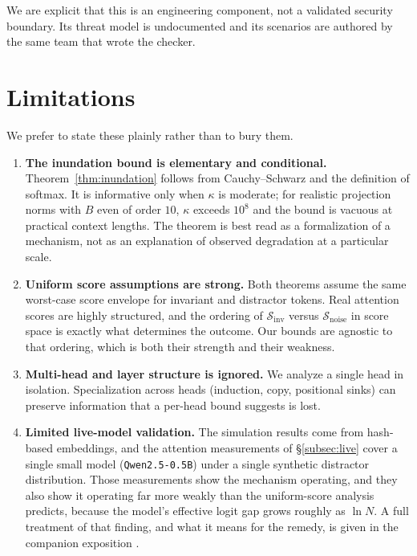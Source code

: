 ﻿\documentclass[11pt,a4paper]{article}
\theoremstyle{plain}
\theoremstyle{definition}
\theoremstyle{remark}
\begin{document}
We are explicit that this is an engineering component, not a validated security
boundary. Its threat model is undocumented and its scenarios are authored by the
same team that wrote the checker.

\section{Limitations}
\label{sec:limits}

We prefer to state these plainly rather than to bury them.

\begin{enumerate}
  \item \textbf{The inundation bound is elementary and conditional.}
        Theorem~\ref{thm:inundation} follows from Cauchy--Schwarz and the
        definition of softmax. It is informative only when $\kappa$ is moderate;
        for realistic projection norms with $B$ even of order $10$, $\kappa$
        exceeds $10^{8}$ and the bound is vacuous at practical context lengths.
        The theorem is best read as a formalization of a mechanism, not as an
        explanation of observed degradation at a particular scale.

  \item \textbf{Uniform score assumptions are strong.} Both theorems assume the
        same worst-case score envelope for invariant and distractor tokens.
        Real attention scores are highly structured, and the ordering of
        $\mathcal{S}_{\mathrm{inv}}$ versus $\mathcal{S}_{\mathrm{noise}}$ in
        score space is exactly what determines the outcome. Our bounds are
        agnostic to that ordering, which is both their strength and their
        weakness.

  \item \textbf{Multi-head and layer structure is ignored.} We analyze a single
        head in isolation. Specialization across heads (induction, copy,
        positional sinks) can preserve information that a per-head bound
        suggests is lost.

  \item \textbf{Limited live-model validation.} The simulation results come from
        hash-based embeddings, and the attention measurements of
        \S\ref{subsec:live} cover a single small model
        (\texttt{Qwen2.5-0.5B}) under a single synthetic distractor
        distribution. Those measurements show the mechanism operating, and they
        also show it operating far more weakly than the uniform-score analysis
        predicts, because the model's effective logit gap grows roughly as
        $\ln N$. A full treatment of that finding, and what it means for the
        remedy, is given in the companion exposition
        \cite{sanyal2026fools}.


\end{enumerate}
\end{document}
